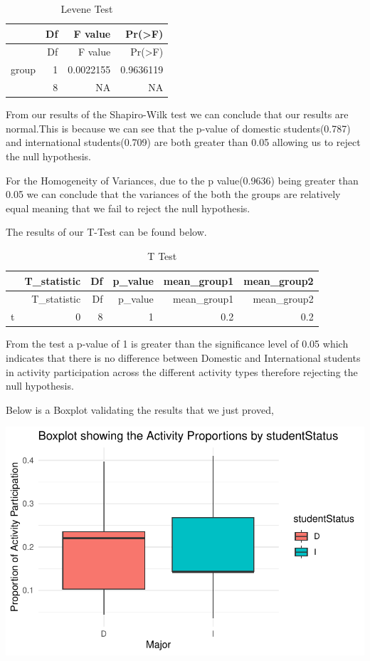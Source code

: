 \documentclass[
  letterpaper,
  DIV=11,
  numbers=noendperiod]{scrartcl}
\begin{document}
\begin{longtable}[]{@{}lrrr@{}}
\caption{Levene Test}\tabularnewline
\toprule\noalign{}
& Df & F value & Pr(\textgreater F) \\
\midrule\noalign{}
\endfirsthead
\toprule\noalign{}
& Df & F value & Pr(\textgreater F) \\
\midrule\noalign{}
\endhead
\bottomrule\noalign{}
\endlastfoot
group & 1 & 0.0022155 & 0.9636119 \\
& 8 & NA & NA \\
\end{longtable}

From our results of the Shapiro-Wilk test we can conclude that our
results are normal.This is because we can see that the p-value of
domestic students(0.787) and international students(0.709) are both
greater than 0.05 allowing us to reject the null hypothesis.

For the Homogeneity of Variances, due to the p value(0.9636) being
greater than 0.05 we can conclude that the variances of the both the
groups are relatively equal meaning that we fail to reject the null
hypothesis.

The results of our T-Test can be found below.

\begin{longtable}[]{@{}lrrrrr@{}}
\caption{T Test}\tabularnewline
\toprule\noalign{}
& T\_statistic & Df & p\_value & mean\_group1 & mean\_group2 \\
\midrule\noalign{}
\endfirsthead
\toprule\noalign{}
& T\_statistic & Df & p\_value & mean\_group1 & mean\_group2 \\
\midrule\noalign{}
\endhead
\bottomrule\noalign{}
\endlastfoot
t & 0 & 8 & 1 & 0.2 & 0.2 \\
\end{longtable}

From the test a p-value of 1 is greater than the significance level of
0.05 which indicates that there is no difference between Domestic and
International students in activity participation across the different
activity types therefore rejecting the null hypothesis.

Below is a Boxplot validating the results that we just proved,

\includegraphics{technical_report_files/figure-pdf/r14-1.pdf}
\end{document}
